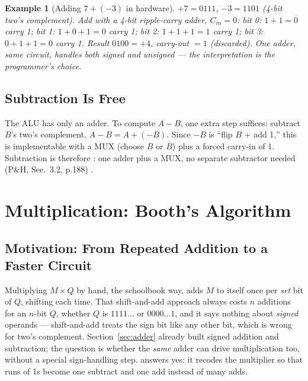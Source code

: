 \documentclass[11pt]{article}
\newtheorem{example}{Example}[section]
\begin{document}
\begin{example}[Adding $7 + (-3)$ in hardware]
$+7 = 0111$, $-3 = 1101$ (4-bit two's complement). Add with a 4-bit ripple-carry adder, $C_{in}=0$: bit 0: $1+1=0$ carry 1; bit 1: $1+0+1=0$ carry 1; bit 2: $1+1+1=1$ carry 1; bit 3: $0+1+1=0$ carry 1. Result $0100 = +4$, carry-out $=1$ (discarded). One adder, same circuit, handles both signed and unsigned --- the interpretation is the programmer's choice.
\end{example}

\subsection{Subtraction Is Free}

The ALU has only an adder. To compute $A - B$, one extra step suffices: subtract $B$'s two's complement, $A - B = A + (-B)$. Since $-B$ is ``flip $B$ + add 1,'' this is implementable with a MUX (choose $B$ or $\bar B$) plus a forced carry-in of 1. Subtraction is therefore : one adder plus a MUX, no separate subtractor needed (P\&H, Sec.~3.2, p.188) \cite{PattersonHennessy2017_computer_organization_design}.

\section{Multiplication: Booth's Algorithm}
\label{sec:booth}

\subsection{Motivation: From Repeated Addition to a Faster Circuit}

Multiplying $M \times Q$ by hand, the schoolbook way, adds $M$ to itself once per \emph{set} bit of $Q$, shifting each time. That shift-and-add approach always costs $n$ additions for an $n$-bit $Q$, whether $Q$ is $1111\dots$ or $0000\dots1$, and it says nothing about \emph{signed} operands --- shift-and-add treats the sign bit like any other bit, which is wrong for two's complement. Section~\ref{sec:adder} already built signed addition and subtraction; the question is whether the \emph{same} adder can drive multiplication too, without a special sign-handling step.  answers yes: it recodes the multiplier so that runs of 1s become one subtract and one add instead of many adds.
\end{document}
